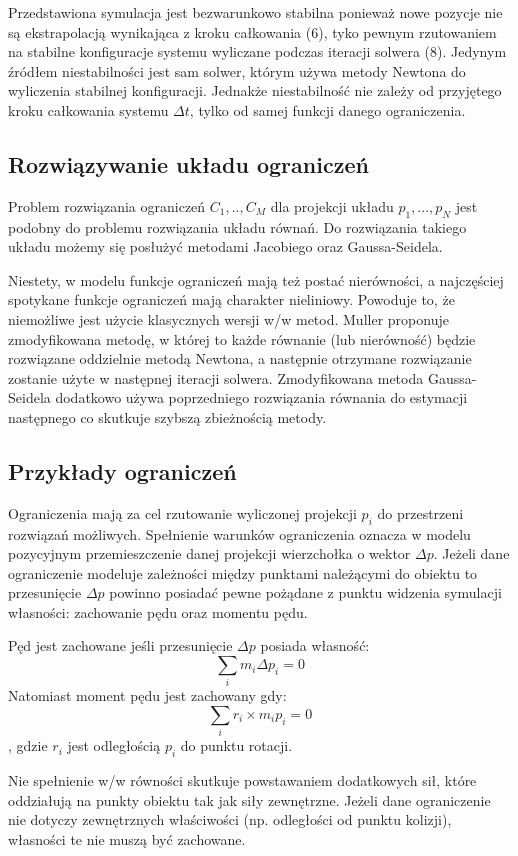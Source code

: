 Przedstawiona symulacja jest bezwarunkowo stabilna ponieważ nowe pozycje nie są
ekstrapolacją wynikająca z kroku całkowania (6), tyko pewnym rzutowaniem na
stabilne konfiguracje systemu wyliczane podczas iteracji solwera (8). Jedynym
źródłem niestabilności jest sam solwer, którym używa metody Newtona do wyliczenia
stabilnej konfiguracji. Jednakże niestabilność nie zależy od przyjętego kroku
całkowania systemu $\Delta t$, tylko od samej funkcji danego
ograniczenia\cite{pbdyn}.

\subsection{Rozwiązywanie układu ograniczeń}
Problem rozwiązania ograniczeń $C_1, .., C_M$ dla projekcji układu $p_1, ..., p_N$
jest podobny do problemu rozwiązania układu równań. Do rozwiązania takiego
układu możemy się posłużyć metodami Jacobiego oraz Gaussa-Seidela. 

Niestety, w modelu funkcje ograniczeń mają też postać nierówności, a
najczęściej spotykane funkcje ograniczeń mają charakter nieliniowy. Powoduje to,
że niemożliwe jest użycie klasycznych wersji w/w metod. Muller proponuje
zmodyfikowana metodę, w której to każde równanie (lub nierówność) będzie rozwiązane
oddzielnie metodą Newtona, a następnie otrzymane rozwiązanie zostanie użyte w
następnej iteracji solwera. Zmodyfikowana metoda Gaussa-Seidela dodatkowo używa
poprzedniego rozwiązania równania do estymacji następnego co skutkuje szybszą
zbieżnością metody\cite{pbdyn}.

\subsection{Przykłady ograniczeń}
Ograniczenia mają za cel rzutowanie wyliczonej projekcji $p_i$ do przestrzeni
rozwiązań możliwych. Spełnienie warunków ograniczenia oznacza w 
modelu pozycyjnym przemieszczenie danej projekcji wierzchołka o wektor $\Delta p$.
Jeżeli dane ograniczenie modeluje zależności między punktami należącymi do
obiektu to przesunięcie $\Delta p$ powinno posiadać
pewne pożądane z punktu widzenia symulacji własności: zachowanie pędu oraz
momentu pędu.

Pęd jest zachowane jeśli przesunięcie $\Delta p$ posiada własność:
$$ \sum_i m_i \Delta p_i = 0$$
Natomiast moment pędu jest zachowany gdy:
$$ \sum_i r_i \times m_i p_i = 0$$, gdzie $r_i$ jest odległością $p_i$ do punktu
rotacji.

Nie spełnienie w/w równości skutkuje powstawaniem dodatkowych sił, które
oddziałują na punkty obiektu tak jak siły zewnętrzne. Jeżeli dane ograniczenie
nie dotyczy zewnętrznych właściwości (np. odległości od punktu kolizji),
własności te nie muszą być zachowane\cite{pbdyn}.

